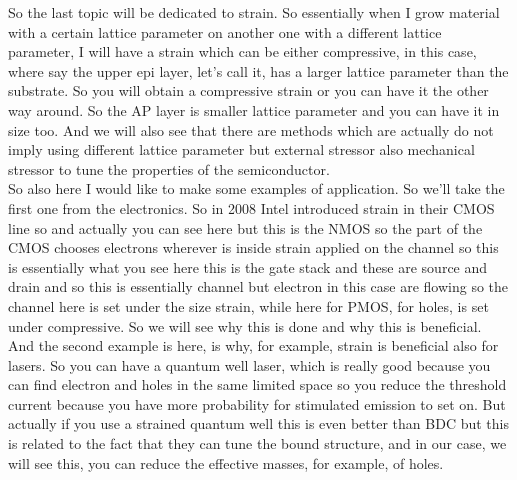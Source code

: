 So the last topic will be dedicated to strain. So essentially when I grow material with a certain lattice parameter on another one with a different lattice parameter, I will have a strain which can be either compressive, in this case, where say the upper epi layer, let's call it, has a larger lattice parameter than the substrate. So you will obtain a compressive strain or you can have it the other way around. So the AP layer is smaller lattice parameter and you can have it in size too. And we will also see that there are methods which are actually do not imply using different lattice parameter but external stressor also mechanical stressor to tune the properties of the semiconductor.\\
So also here I would like to make some examples of application. So we'll take the first one from the electronics. So in 2008 Intel introduced strain in their CMOS line so and actually you can see here but this is the NMOS so the part of the CMOS chooses electrons wherever is inside strain applied on the channel so this is essentially what you see here this is the gate stack and these are source and drain and so this is essentially channel but electron in this case are flowing so the channel here is set under the size strain, while here for PMOS, for holes, is set under compressive. So we will see why this is done and why this is beneficial. And the second example is here, is why, for example, strain is beneficial also for lasers. So you can have a quantum well laser, which is really good because you can find electron and holes in the same limited space so you reduce the threshold current because you have more probability for stimulated emission to set on. But actually if you use a strained quantum well this is even better than BDC but this is related to the fact that they can tune the bound structure, and in our case, we will see this, you can reduce the effective masses, for example, of holes.

